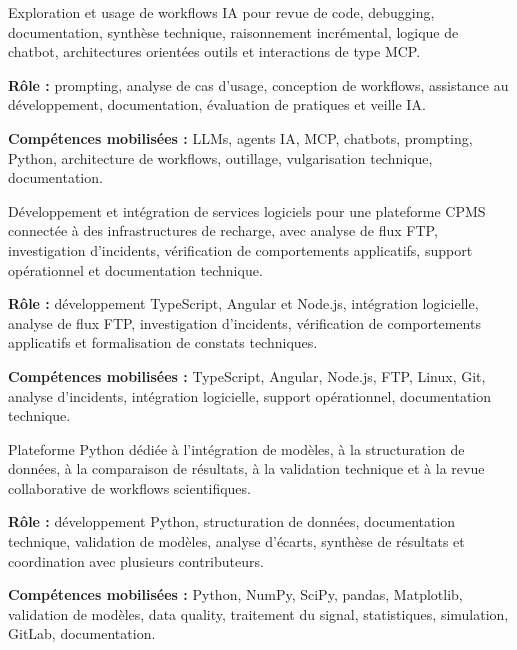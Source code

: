 \documentclass[8pt,a4paper,ragged2e,withhyper]{altacv}
\begin{document}
Exploration et usage de workflows IA pour revue de code, debugging, documentation, synthèse technique, raisonnement incrémental, logique de chatbot, architectures orientées outils et interactions de type MCP.

\textbf{Rôle :} prompting, analyse de cas d’usage, conception de workflows, assistance au développement, documentation, évaluation de pratiques et veille IA.

\textbf{Compétences mobilisées :} LLMs, agents IA, MCP, chatbots, prompting, Python, architecture de workflows, outillage, vulgarisation technique, documentation.

\divider


Développement et intégration de services logiciels pour une plateforme CPMS connectée à des infrastructures de recharge, avec analyse de flux FTP, investigation d’incidents, vérification de comportements applicatifs, support opérationnel et documentation technique.

\textbf{Rôle :} développement TypeScript, Angular et Node.js, intégration logicielle, analyse de flux FTP, investigation d’incidents, vérification de comportements applicatifs et formalisation de constats techniques.

\textbf{Compétences mobilisées :} TypeScript, Angular, Node.js, FTP, Linux, Git, analyse d’incidents, intégration logicielle, support opérationnel, documentation technique.

\divider


Plateforme Python dédiée à l’intégration de modèles, à la structuration de données, à la comparaison de résultats, à la validation technique et à la revue collaborative de workflows scientifiques.

\textbf{Rôle :} développement Python, structuration de données, documentation technique, validation de modèles, analyse d’écarts, synthèse de résultats et coordination avec plusieurs contributeurs.

\textbf{Compétences mobilisées :} Python, NumPy, SciPy, pandas, Matplotlib, validation de modèles, data quality, traitement du signal, statistiques, simulation, GitLab, documentation.
\end{document}
